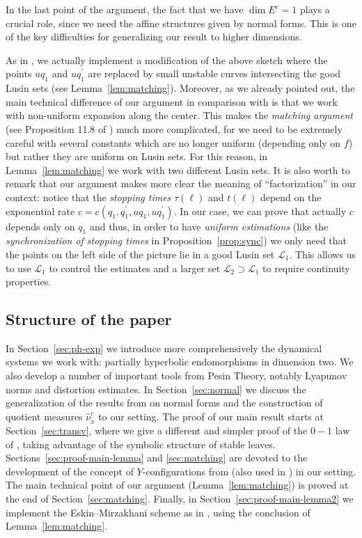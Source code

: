 \documentclass[a4paper,11pt,reqno]{amsart}
\newcommand{\cL}{{\mathcal L}}
\newcommand{\tix}{\tilde{x}}
\theoremstyle{definition}
\begin{document}
In the last point of the argument, the fact that we have $\dim E^c=1$ plays a crucial role, since we need the affine structures given by normal forms. This is one of the key difficulties for generalizing our result to higher dimensions. 

As in \cite{ALOS}, we actually implement a modification of the above sketch where the points $uq_1$ and $uq_1^{\prime}$ are replaced by small unstable curves intersecting the good Lusin sets (see Lemma~\ref{lem:matching}). Moreover, as we already pointed out, the main technical difference of our argument in comparison with \cite{ALOS} is that we work with non-uniform expansion along the center. This makes the \emph{matching argument} (see Proposition 11.8 of \cite{ALOS}) much more complicated, for we need to be extremely careful with several constants which are no longer uniform (depending only on $f$) but rather they are uniform on Lusin sets. For this reason, in Lemma~\ref{lem:matching} we work with two different Lusin sets. It is also worth to remark that our argument makes more clear the meaning of ``factorization'' in our context: notice that the \emph{stopping times} $\tau(\ell)$ and $t(\ell)$ depend on the exponential rate $c=c(q_1,q_1^{\prime},uq_1,uq_1^{\prime})$. In our case, we can prove that actually $c$ depends only on $q_1$ and thus, in order to have \emph{uniform estimations} (like the \emph{synchronization of stopping times} in Proposition~\ref{prop:sync})    we only need that the points on the left side of the picture lie in a good Lusin set $\cL_1$. This allows us to use $\cL_1$ to control the estimates and a larger set $\cL_2\supset\cL_1$ to require continuity properties.   

\subsection{Structure of the paper}
In Section~\ref{sec:ph-exp} we introduce more comprehensively the dynamical systems we work with: partially hyperbolic endomorphisms in dimension two. We also develop a number of important tools from Pesin Theory, notably Lyapunov norms and distortion estimates. In Section~\ref{sec:normal} we discuss the generalization of the results from \cite{ALOS} on normal forms and the construction of quotient measures $\hat{\nu}^c_{\tix}$ to our setting. The proof of our main result starts at Section~\ref{sec:transv}, where we give a different and simpler proof of the $0-1$ law of \cite{ALOS,BRH}, taking advantage of the symbolic structure of stable leaves. Sections~\ref{sec:proof-main-lemma} and \ref{sec:matching} are devoted to the development of the concept of $Y$-configurations from \cite{EskinMirzakhani,EskinLind} (also used in \cite{Katz,ALOS}) in our setting. The main technical point of our argument (Lemma~\ref{lem:matching}) is proved at the end of Section~\ref{sec:matching}. Finally, in Section~\ref{sec:proof-main-lemma2} we implement the Eskin--Mirzakhani scheme as in \cite{ALOS}, using the conclusion of Lemma~\ref{lem:matching}.
\end{document}

